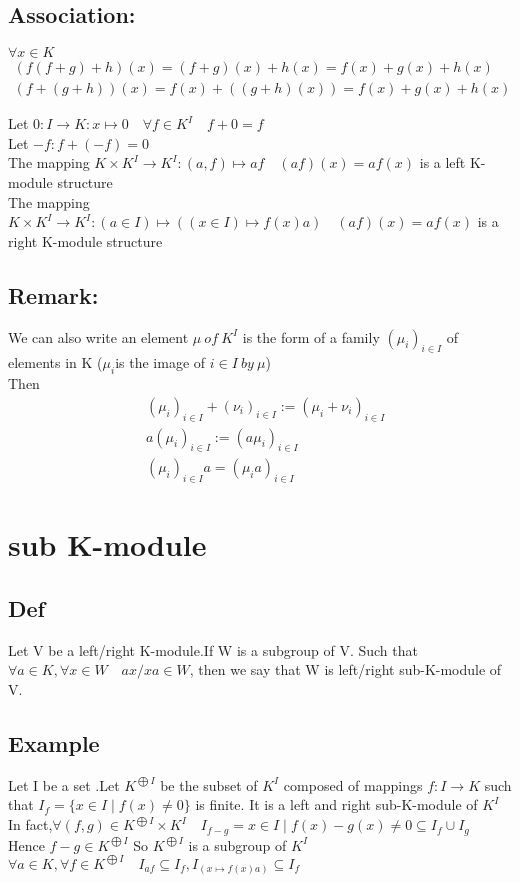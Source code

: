 \documentclass{book}
\begin{document}
\subsection{Association:}
$\forall x\in K$
\begin{align*}
    (f(f+g)+h)(x)=(f+g)(x)+h(x)=f(x)+g(x)+h(x)\\
    (f+(g+h))(x)=f(x)+((g+h)(x))=f(x)+g(x)+h(x)
\end{align*} 

Let $0:I\rightarrow K:x\mapsto0 \quad \forall f\in K^I\quad f+0=f$\\
Let $-f: f+(-f)=0$\\
The mapping $K\times K^I\rightarrow K^I:(a,f)\mapsto af\quad (af)(x)=af(x)$ is a left K-module structure\\
The mapping $K\times K^I\rightarrow K^I:(a\in I)\mapsto ((x\in I)\mapsto f(x)a)\quad (af)(x)=af(x)$ is a right K-module structure
\subsection{Remark:}

We can also write an element $\mu\ of\ K^I$ is the form of a family $(\mu_i)_{i\in I}$ of elements in K ($\mu_i$is the image of $i\in I\ by\ \mu$)\\
Then \begin{align*}
    &(\mu_i)_{i\in I}+(\nu_i)_{i\in I}:=(\mu_i+\nu_i)_{i\in I}\\
    &a(\mu_i)_{i\in I}:=(a\mu_i)_{i\in I}\\
    &(\mu_i)_{i\in I}a=(\mu_ia)_{i\in I}
\end{align*}
\section{sub K-module}
\subsection{Def}

Let V be a left/right K-module.If W is a subgroup of V. Such that $\forall a\in K,\forall x\in W\quad ax/xa\in W$, then we say that W is left/right sub-K-module of V.
\subsection{Example}

Let I be a set .Let $K^{\bigoplus I}$ be the subset of $K^I$ composed of mappings $f:I\rightarrow K$ such that $I_f=\{x\in I\mid f(x)\not=0\}$ is finite. It is a left and right sub-K-module of $K^I$\\
\indent In fact,$\forall (f,g)\in K^{\bigoplus I}\times K^I\quad I_{f-g}={x\in I\mid f(x)-g(x)\not=0}\subseteq I_f\cup I_g$\\
\indent Hence $f-g\in K^{\bigoplus I}$ So $K^{\bigoplus I}$ is a subgroup of $K^I$\\
\indent $\forall a\in K,\forall f\in K^{\bigoplus I}\quad I_{af}\subseteq I_f,I_{(x\mapsto f(x)a)}\subseteq I_f$
\end{document}
